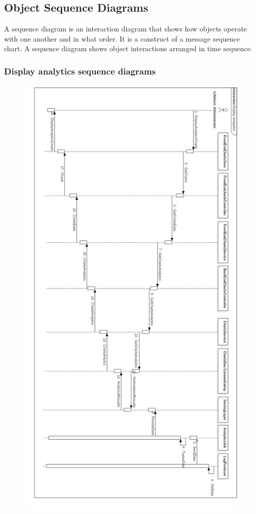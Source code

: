 \subsection{Object Sequence Diagrams}

A sequence diagram is an interaction diagram that shows how objects operate with one another 
and in what order. 
It is a construct of a message sequence chart. 
A sequence diagram shows object interactions arranged in time sequence.
\newpage
\subsubsection{Display analytics sequence diagrams}
\label{subsec:subsec01}
\begin{figure}[h!]
	\centering
	\includegraphics[height=0.85\textheight]{fig01/DisplayAnalyticsSequenceDiagram}

\end{figure}
